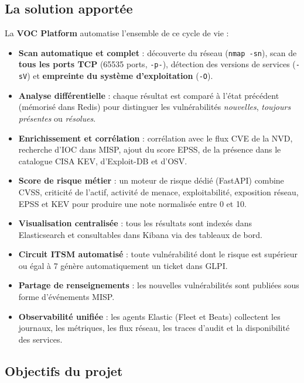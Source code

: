 \subsection{La solution apport\'ee}

La \textbf{VOC Platform} automatise l'ensemble de ce cycle de vie :

\begin{itemize}[leftmargin=1.6em]
  \item \textbf{Scan automatique et complet} : d\'ecouverte du r\'eseau
        (\texttt{nmap -sn}), scan de \textbf{tous les ports TCP} (65535 ports,
        \texttt{-p-}), d\'etection des versions de services (\texttt{-sV}) et
        \textbf{empreinte du syst\`eme d'exploitation} (\texttt{-O}).
  \item \textbf{Analyse diff\'erentielle} : chaque r\'esultat est compar\'e
        \`a l'\'etat pr\'ec\'edent (m\'emoris\'e dans Redis) pour distinguer
        les vuln\'erabilit\'es \emph{nouvelles}, \emph{toujours pr\'esentes}
        ou \emph{r\'esolues}.
  \item \textbf{Enrichissement et corr\'elation} : corr\'elation avec le flux
        CVE de la NVD, recherche d'IOC dans MISP, ajout du score EPSS, de la
        pr\'esence dans le catalogue CISA KEV, d'Exploit-DB et d'OSV.
  \item \textbf{Score de risque m\'etier} : un moteur de risque d\'edi\'e
        (FastAPI) combine CVSS, criticit\'e de l'actif, activit\'e de menace,
        exploitabilit\'e, exposition r\'eseau, EPSS et KEV pour produire une
        note normalis\'ee entre 0 et 10.
  \item \textbf{Visualisation centralis\'ee} : tous les r\'esultats sont
        index\'es dans Elasticsearch et consultables dans Kibana via des
        tableaux de bord.
  \item \textbf{Circuit ITSM automatis\'e} : toute vuln\'erabilit\'e dont le
        risque est sup\'erieur ou \'egal \`a 7 g\'en\`ere automatiquement un
        ticket dans GLPI.
  \item \textbf{Partage de renseignements} : les nouvelles vuln\'erabilit\'es
        sont publi\'ees sous forme d'\'ev\'enements MISP.
  \item \textbf{Observabilit\'e unifi\'ee} : les agents Elastic (Fleet et
        Beats) collectent les journaux, les m\'etriques, les flux r\'eseau,
        les traces d'audit et la disponibilit\'e des services.
\end{itemize}

\subsection{Objectifs du projet}

